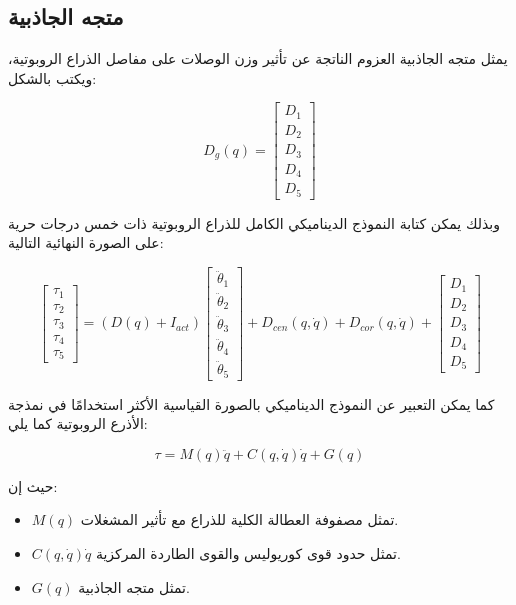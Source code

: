 \subsection*{متجه الجاذبية}

يمثل متجه الجاذبية العزوم الناتجة عن تأثير وزن الوصلات على مفاصل الذراع الروبوتية، ويكتب بالشكل:

\begin{equation}
D_g(q)=
\begin{bmatrix}
D_1 \\
D_2 \\
D_3 \\
D_4 \\
D_5
\end{bmatrix}
\end{equation}

وبذلك يمكن كتابة النموذج الديناميكي الكامل للذراع الروبوتية ذات خمس درجات حرية على الصورة النهائية التالية:

\begin{equation}
\begin{bmatrix}
\tau_1 \\
\tau_2 \\
\tau_3 \\
\tau_4 \\
\tau_5
\end{bmatrix}
=
\left(
D(q)+I_{act}
\right)
\begin{bmatrix}
\ddot{\theta}_1 \\
\ddot{\theta}_2 \\
\ddot{\theta}_3 \\
\ddot{\theta}_4 \\
\ddot{\theta}_5
\end{bmatrix}
+
D_{cen}(q,\dot{q})
+
D_{cor}(q,\dot{q})
+
\begin{bmatrix}
D_1 \\
D_2 \\
D_3 \\
D_4 \\
D_5
\end{bmatrix}
\end{equation}

كما يمكن التعبير عن النموذج الديناميكي بالصورة القياسية الأكثر استخدامًا في نمذجة الأذرع الروبوتية كما يلي:

\begin{equation}
\tau =
M(q)\ddot{q}
+
C(q,\dot{q})\dot{q}
+
G(q)
\end{equation}

حيث إن:

\begin{itemize}
    \item $M(q)$ تمثل مصفوفة العطالة الكلية للذراع مع تأثير المشغلات.
    \item $C(q,\dot{q})\dot{q}$ تمثل حدود قوى كوريوليس والقوى الطاردة المركزية.
    \item $G(q)$ تمثل متجه الجاذبية.
\end{itemize}

